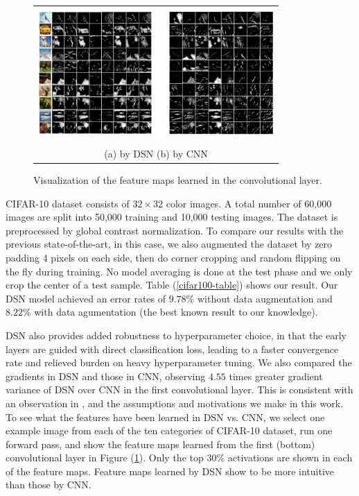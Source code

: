 \documentclass{article} %
\begin{document}
\begin{figure}
\vspace{-2mm}
\begin{center}
\begin{tabular}{c}
\includegraphics[width=90mm]{visualization4} \\
(a) by DSN \hspace{15mm}  (b) by CNN \\
\end{tabular}
\vspace{-3mm}
\caption{Visualization of the feature maps learned in the convolutional layer.}
\label{fig:visualization}
\end{center}
\vspace{-5mm}
\end{figure}

CIFAR-10 dataset consists of $32 \times 32$ color images. A total number of 60,000 images are split into 50,000 training and 10,000 testing images. The dataset is preprocessed by global contrast normalization. To compare our results with the previous state-of-the-art, in this case, we also augmented the dataset by zero padding 4 pixels on each side, then do corner cropping and random flipping on the fly during training.
No model averaging is done at the test phase and we only crop the center of a test sample. 
Table (\ref{cifar100-table}) shows our result. Our DSN model achieved an error rates of $9.78\%$ without data augmentation and $8.22\%$ with data agumentation (the best known result to our knowledge).

DSN also provides added robustness to hyperparameter choice, in that the early layers are guided with direct classification loss, leading to a faster convergence rate and relieved burden on heavy hyperparameter tuning. 
We also compared the gradients in DSN and those in CNN, observing $4.55$ times greater gradient variance of DSN over CNN in the  first convolutional layer. This is consistent with an observation in \cite{maxout}, and the assumptions and motivations we make in this work. 
To see what the features have been learned in DSN vs. CNN, we select one example image from each of the ten categories of CIFAR-10 dataset, run one forward pass, and show the feature maps learned from the first (bottom) convolutional layer in Figure (\ref{fig:visualization}). Only the top 30\% activations are shown in each of the feature maps. Feature maps learned by DSN show to be more intuitive than those by CNN.
\end{document}
